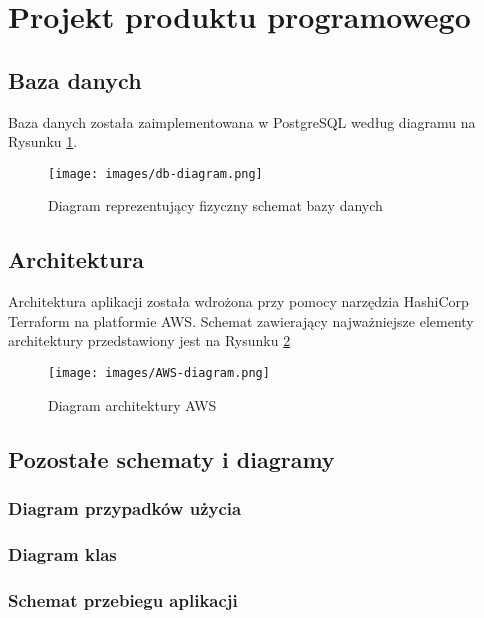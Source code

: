 \documentclass[../main.tex]{subfiles}
\begin{document}
\section{Projekt produktu programowego}
    \subsection{Baza danych}
        Baza danych została zaimplementowana w PostgreSQL według diagramu na Rysunku \ref{fig:db-diagram}.

        \begin{figure}[!ht]
            \centering
            \texttt{[image: images/db-diagram.png]}
            \caption{Diagram reprezentujący fizyczny schemat bazy danych}
            \label{fig:db-diagram}
        \end{figure}

    \subsection{Architektura}
        Architektura aplikacji została wdrożona przy pomocy narzędzia HashiCorp Terraform na platformie AWS. Schemat zawierający najważniejsze elementy architektury przedstawiony jest na Rysunku \ref{fig:aws-architecture} 
        \begin{figure}[!ht]
            \centering
            \texttt{[image: images/AWS-diagram.png]}
            \caption{Diagram architektury AWS}
            \label{fig:aws-architecture}
        \end{figure}

    \subsection{Pozostałe schematy i diagramy}

        \subsubsection*{Diagram przypadków użycia}
        \subsubsection*{Diagram klas}
        \subsubsection*{Schemat przebiegu aplikacji}
\end{document}
